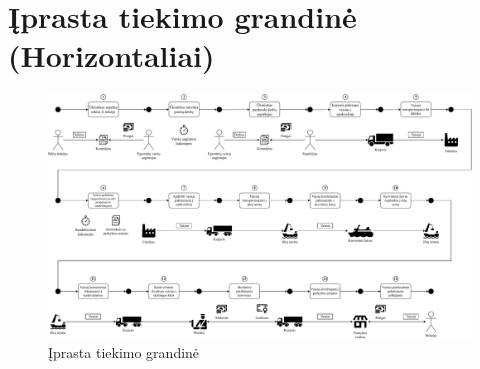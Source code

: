 \section{Įprasta tiekimo grandinė (Horizontaliai)}
\begin{figure}[H]
    \centering
    \includegraphics[scale=0.4]{images/supply-chain-horizontal}
    \caption{Įprasta tiekimo grandinė}
\end{figure}

